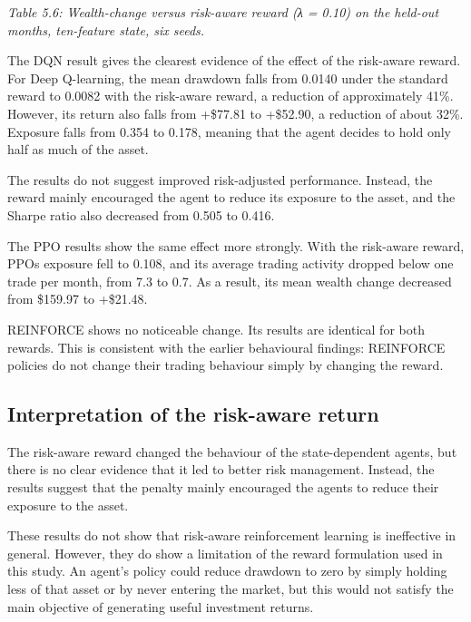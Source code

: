 \emph{Table 5.6: Wealth-change versus risk-aware reward (λ = 0.10) on
the held-out months, ten-feature state, six seeds.}

The DQN result gives the clearest evidence of the effect of the
risk-aware reward. For Deep Q-learning, the mean drawdown falls from
0.0140 under the standard reward to 0.0082 with the risk-aware reward, a
reduction of approximately 41\%. However, its return also falls from
+\$77.81 to +\$52.90, a reduction of about 32\%. Exposure falls from
0.354 to 0.178, meaning that the agent decides to hold only half as much
of the asset.

The results do not suggest improved risk-adjusted performance. Instead,
the reward mainly encouraged the agent to reduce its exposure to the
asset, and the Sharpe ratio also decreased from 0.505 to 0.416.

The PPO results show the same effect more strongly. With the risk-aware
reward, PPO\textquotesingle s exposure fell to 0.108, and its average
trading activity dropped below one trade per month, from 7.3 to 0.7. As
a result, its mean wealth change decreased from \$159.97 to +\$21.48.

REINFORCE shows no noticeable change. Its results are identical for both
rewards. This is consistent with the earlier behavioural findings:
REINFORCE policies do not change their trading behaviour simply by
changing the reward.

\subsection{Interpretation of the risk-aware return}

The risk-aware reward changed the behaviour of the state-dependent
agents, but there is no clear evidence that it led to better risk
management. Instead, the results suggest that the penalty mainly
encouraged the agents to reduce their exposure to the asset.

These results do not show that risk-aware reinforcement learning is
ineffective in general. However, they do show a limitation of the reward
formulation used in this study. An agent's policy could reduce drawdown
to zero by simply holding less of that asset or by never entering the
market, but this would not satisfy the main objective of generating
useful investment returns.

